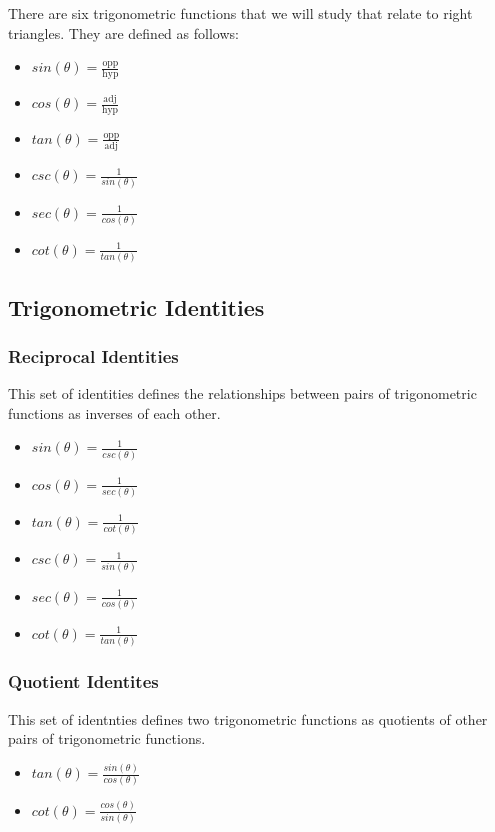There are six trigonometric functions that we will study that relate to right
triangles.  They are defined as follows:
\begin{itemize}
  \item{$sin(\theta)=\frac{\text{opp}}{\text{hyp}}$}
  \item{$cos(\theta)=\frac{\text{adj}}{\text{hyp}}$}
  \item{$tan(\theta)=\frac{\text{opp}}{\text{adj}}$}
  \item{$csc(\theta)=\frac{1}{sin(\theta)}$}
  \item{$sec(\theta)=\frac{1}{cos(\theta)}$}
  \item{$cot(\theta)=\frac{1}{tan(\theta)}$}
\end{itemize}

\subsection{Trigonometric Identities}

\subsubsection{Reciprocal Identities}
This set of identities defines the relationships between pairs of trigonometric
functions as inverses of each other.

\begin{itemize}
  \item{$sin(\theta)=\frac{1}{csc(\theta)}$}
  \item{$cos(\theta)=\frac{1}{sec(\theta)}$}
  \item{$tan(\theta)=\frac{1}{cot(\theta)}$}
  \item{$csc(\theta)=\frac{1}{sin(\theta)}$}
  \item{$sec(\theta)=\frac{1}{cos(\theta)}$}
  \item{$cot(\theta)=\frac{1}{tan(\theta)}$}
\end{itemize}

\subsubsection{Quotient Identites}
This set of identnties defines two trigonometric functions as quotients of other
pairs of trigonometric functions.

\begin{itemize}
  \item{$tan(\theta)=\frac{sin(\theta)}{cos(\theta)}$}
  \item{$cot(\theta)=\frac{cos(\theta)}{sin(\theta)}$}
\end{itemize}

